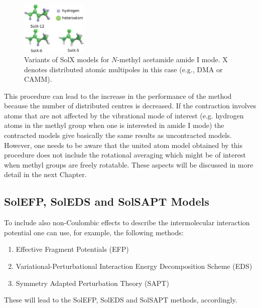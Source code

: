 \documentclass[a4paper,titlepage,twoside,fleqn,12pt]{book}
\begin{document}
\begin{refsection}
\begin{figure}[b!]
\begin{center}
    \includegraphics[width=0.28\textwidth]{SolXn.eps}
  \end{center}
  \caption{Variants of SolX models for $N$-methyl acetamide amide I mode.
X denotes distributed atomic multipoles in this case (e.g., DMA or CAMM).\label{f:solxn}}
\end{figure}
%
\noindent This procedure can lead to the increase in the performance
of the method because the number of distributed centres
is decreased. If the contraction involves atoms that 
are not affected by the vibrational mode of interest (e.g. 
hydrogen atoms in the methyl group when one is interested
in amide I mode) the contracted models give basically 
the same results as uncontracted models. However, one needs to 
be aware that the united atom model obtained by this procedure
does not include the rotational averaging which might be of
interest when methyl groups are freely rotatable. These aspects 
will be discussed in more detail in the next Chapter. 

\subsection{SolEFP, SolEDS and SolSAPT Models\label{s:solefp-soleds-solsapt}}

To include also non\hyp{}Coulombic effects to describe 
the intermolecular interaction potential one can use, for example,
the following methods:
%
\begin{enumerate}
  \item Effective Fragment 
Potentials \citep{Day.Jensen.Gordon.Webb.Stevens.Krauss.Garmer.Basch.Cohen.JCP.1996,
Flick.Kosenkov.Hohenstein.Sherrill.Slipchenko.JCTC.2012} (EFP)
  \item Variational\hyp{}Perturbational Interaction Energy Decomposition
Scheme \citep{Sokalski.Roszak.Pecul.CPL.1988,
Chalasinski.Szczesniak.MolPhys.1988,Cybulski.Chalasinski.Moszynski.JCP.1990,
Gora.Bartkowiak.Roszak.Leszczynski.JCP.2004} (EDS)
  \item Symmetry Adapted Perturbation Theory \citep{Jeziorski.Moszynski.Szalewicz.ChemRev.1994} (SAPT)
\end{enumerate}
%
These will lead to the SolEFP, SolEDS and SolSAPT methods, accordingly. 


\end{refsection}
\end{document}
